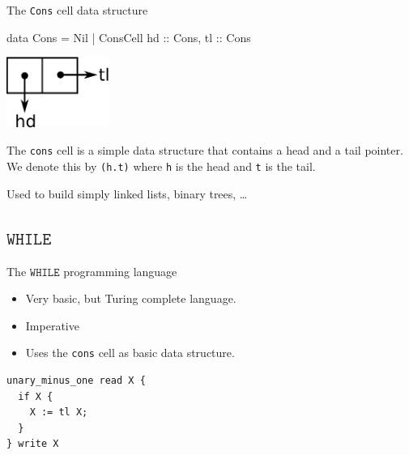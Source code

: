 \documentclass{beamer}
\newcommand*{\WHILE}{\ensuremath{\mathtt{WHILE}}\xspace}
\theoremstyle{definition}
\begin{document}
\begin{frame}[fragile]{The {\tt Cons}\/ cell data structure}
	
	\begin{center}
	\begin{code}
		data Cons = Nil | ConsCell { hd :: Cons, tl :: Cons }
	\end{code}
		\includegraphics[width=0.25\textwidth]{pictures/conscell}
	\end{center}
	The {\tt cons}\/ cell is a simple data structure that contains a head and a 
	tail pointer. We denote this by {\tt (h.t)}\/ where {\tt h}\/ is the head and 
	{\tt t}\/ is the tail.
	\pause

	Used to build simply linked lists, binary trees, \dots
\end{frame}

\subsection{\WHILE}
\begin{frame}[fragile]{The \WHILE programming language}
	
	\begin{itemize}
		\item Very basic, but Turing complete language.
		\item Imperative
		\item Uses the {\tt cons} cell as basic data structure.
	\end{itemize}
	\begin{example}
		\begin{verbatim}
unary_minus_one read X {
  if X {
    X := tl X;
  }
} write X\end{verbatim}
	\end{example}
\end{frame}
\end{document}
